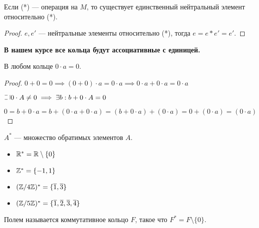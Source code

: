 \begin{notice}
    Если (*) --- операция на $M$, то существует единственный нейтральный элемент относительно (*).
\end{notice}

\begin{proof}
    $e, e'$ --- нейтральные элементы относительно (*), тогда $e = e * e' = e'$.
\end{proof}

\begin{theorem-non}
    {\textbf{В нашем курсе все кольца будут ассоциативные с единицей.}}
\end{theorem-non}

\begin{lemma}
    В любом кольце $0 \cdot a = 0$.
\end{lemma}
\begin{proof}

    $0 + 0 = 0 \implies (0 + 0) \cdot a = 0 \cdot a \implies 0 \cdot a + 0 \cdot a = 0 \cdot a$

    $\letus 0 \cdot A \neq 0 \implies \exists b: b + 0 \cdot A = 0$
    
    $0 = b + 0 \cdot a = b + (0 \cdot a + 0 \cdot a) = (b + 0 \cdot a) + (0 \cdot a) = 0 + (0 \cdot a) = (0 \cdot a)$
\end{proof}

\begin{defn}
    $A^*$ --- множество обратимых элементов $A$.
\end{defn}

\begin{examples}
    \begin{itemize}
        \item $\mathbb{R}^* = \mathbb{R} \setminus \{0\}$
        \item $\mathbb{Z}^* = \{-1, 1\}$
        \item $(\mathbb{Z}/4\mathbb{Z})^* = \{\overline{1}, \overline{3}\}$
        \item $(\mathbb{Z}/5\mathbb{Z})^* = \{\overline{1}, \overline{2}, \overline{3}, \overline{4}\}$
    \end{itemize}
\end{examples}

\begin{defn}
    Полем называется коммутативное кольцо $F$, такое что $F^* = F \setminus \{0\}$.
\end{defn}